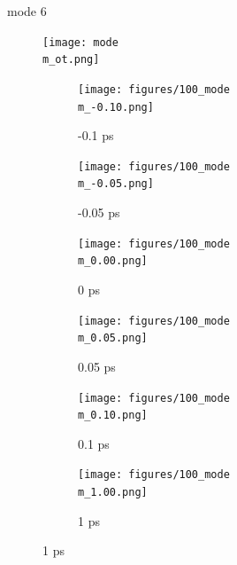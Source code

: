 \documentclass{beamer}
\newcommand\w{0.32}
\begin{document}
\renewcommand\m{6}
\begin{frame}{mode \m}
	\vspace{\vh mm}
	\begin{figure}
		\centering
		\texttt{[image: mode\\m\_ot.png]}
	\end{figure}
	\begin{figure}
		\centering
		\begin{subfigure}[b]{\w\textwidth}
			\centering
			\texttt{[image: figures/100\_mode\\m\_-0.10.png]}
			\caption{-0.1 ps}
		\end{subfigure}
		\begin{subfigure}[b]{\w\textwidth}
			\centering
			\texttt{[image: figures/100\_mode\\m\_-0.05.png]}
			\caption{-0.05 ps}
		\end{subfigure}
		\begin{subfigure}[b]{\w\textwidth}
			\centering
			\texttt{[image: figures/100\_mode\\m\_0.00.png]}
			\caption{0 ps}
		\end{subfigure}
		\begin{subfigure}[b]{\w\textwidth}
			\centering
			\texttt{[image: figures/100\_mode\\m\_0.05.png]}
			\caption{0.05 ps}
		\end{subfigure}
		\begin{subfigure}[b]{\w\textwidth}
			\centering
			\texttt{[image: figures/100\_mode\\m\_0.10.png]}
			\caption{0.1 ps}
		\end{subfigure}
		\begin{subfigure}[b]{\w\textwidth}
			\centering
			\texttt{[image: figures/100\_mode\\m\_1.00.png]}
			\caption{1 ps}
		\end{subfigure}
	\end{figure}
\end{frame}

\renewcommand\m{7}
\end{document}
